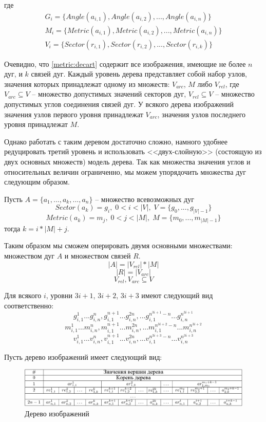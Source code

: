 где
\begin{equation}
\begin{array}{c}
G_i = \{Angle(a_{i,1}), Angle(a_{i,2}), ..., Angle(a_{i,n})\} \\
M_i = \{Metric(a_{i,1}), Metric(a_{i,2}), ..., Metric(a_{i,n})\} \\
V_i = \{Sector(r_{i,1}), Sector(r_{i,2}), ..., Sector(r_{i,k})\}
\end{array}
\end{equation}

Очевидно, что \ref{metric:decart} содержит все изображения, имеющие не более $n$ дуг, и $k$ связей дуг. Каждый уровень дерева представляет собой набор узлов, значения которых принадлежат одному из множеств: $V_{arc}$, $M$ либо $V_{rel}$, где $V_{arc} \subseteq V$ -- множество допустимых значений секторов дуг, $V_{rel} \subseteq V$ -- множество допустимых углов соединения связей дуг. У всякого дерева изображений значения узлов первого уровня принадлежат $V_{arc}$, значения узлов последнего уровня принадлежат $M$.

Однако работать с таким деревом достаточно сложно, намного удобнее редуцировать третий уровень и использовать <<двух-слойную>> (состоящую из двух основных множеств) модель дерева. Так как множества значения углов и относительных величин ограниченно, мы можем упорядочить множества дуг следующим образом.

Пусть $A = \{a_1, ..., a_k, ..., a_n\}$ -- множество всевозможных дуг
$$Sector(a_k) = g_i,\; 0 < i < |V|,\;V = \{g_0, ..., g_{|V|-1}\}$$
$$Metric(a_k) = m_j,\; 0 < j < |M|,\;M = \{m_0, ..., m_{|M|-1}\}$$
тогда $k = i*|M| + j$.

Таким образом мы сможем оперировать двумя основными множествами: множеством дуг $A$ и множеством связей $R$.
$$|A| = |V_{rel}|*|M|$$
$$|R| = |V_{arc}|$$
$$V_{rel}, V_{arc} \subseteq V$$


Для всякого $i$, уровни $3i + 1$, $3i + 2$, $3i + 3$ имеют следующий вид соответственно:
$$ g^1_{i,1} ... g^n_{i,n}, g^{n+1}_{i,1} ... g^{2n}_{i,n}, ... g^{n^{3i+1}-n}_{i,1} ... g^{n^{3i+1}}_{i,n} $$
$$ m^1_{i,1} ... m^n_{i,n}, m^{n+1}_{i,1} ... m^{2n}_{i,n}, ... m^{n^{3i+2}-n}_{i,1} ... m^{n^{3i+2}}_{i,n} $$
$$ v^1_{i,1} ... v^n_{i,n}, v^{n+1}_{i,1} ... v^{2n}_{i,n}, ... v^{n^{3i+3}-n}_{i,1} ... v^{n^{3i+3}}_{i,n} $$

Пусть дерево изображений имеет следующий вид:
\begin{figure}[h]
\includegraphics[width=\linewidth,keepaspectratio]{images/an_tbl2.jpg}
\caption{Дерево изображений}
\end{figure}

